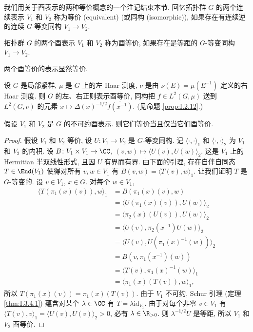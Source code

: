 我们用关于酉表示的两种等价概念的一个注记结束本节. 回忆拓扑群 $G$ 的两个连续表示 $V_1$ 和 $V_2$ 称为等价 (equivalent) (或同构 (isomorphic)), 如果存在有连续逆的连续 $G$-等变同构 $V_1 \to V_2$.

\begin{definition}
\label{def:IV.2.4}
拓扑群 $G$ 的两个酉表示 $V_1$ 和 $V_2$ 称为酉等价, 如果存在是等距的 $G$-等变同构 $V_1 \to V_2$.
\end{definition}

两个酉等价的表示显然等价.

\begin{example}[左右正则表示的酉等价]
\label{exa:IV.2.5}
设 $G$ 是局部紧群, $\mu$ 是 $G$ 上的左 Haar 测度, $\nu$ 是由 $\nu(E) = \mu(E^{-1})$ 定义的右 Haar 测度.
则 $G$ 的左、右正则表示酉等价, 同构把 $f \in L^2(G, \mu)$ 送到 $L^2(G, \nu)$ 的元素 $x \longmapsto \Delta(x)^{-1/2}\overline{f(x^{-1})}$. (见命题 \ref{prop:I.2.12}.)
\end{example}

\begin{proposition}[不可约表示的等价与酉等价]
\label{prop:IV.2.6}
假设 $V_1$ 和 $V_2$ 是 $G$ 的不可约酉表示. 则它们等价当且仅当它们酉等价.
\end{proposition}

\begin{proof}
假设 $V_1$ 和 $V_2$ 等价, 设 $U \colon V_1 \to V_2$ 是 $G$-等变同构. 记 $\langle \cdot, \cdot \rangle_1$ 和 $\langle \cdot, \cdot \rangle_2$ 为 $V_1$ 和 $V_2$ 的内积. 设 $B \colon V_1 \times V_1 \to \CC$, $(v, w) \longmapsto \langle U(v), U(w) \rangle_2$. 这是 $V_1$ 上的 Hermitian 半双线性形式, 且因 $U$ 有界而有界. 由下面的引理, 存在自伴自同态 $T \in \End(V_1)$ 使得对所有 $v, w \in V_1$ 有 $B(v, w) = \langle T(v), w \rangle_1$. 让我们证明 $T$ 是 $G$-等变的. 设 $v \in V_1$, $x \in G$. 对每个 $w \in V_1$,
\begin{align*}
\langle T(\pi_1(x)(v)), w \rangle_1 &= B(\pi_1(x)(v), w) \\
&= \langle U(\pi_1(x)(v)), U(w) \rangle_2 \\
&= \langle \pi_2(x)(U(v)), U(w) \rangle_2 \\
&= \langle U(v), \pi_2(x^{-1})U(w) \rangle_2 \\
&= \langle U(v), U(\pi_1(x)^{-1}(w)) \rangle_2 \\
&= B(v, \pi_1(x^{-1})(w)) \\
&= \langle T(v), \pi_1(x)^{-1}(w) \rangle_1 \\
&= \langle \pi_1(x)(T(v)), w \rangle_1,
\end{align*}
所以 $T(\pi_1(x)(v)) = \pi_1(x)(T(v))$. 由于 $V_1$ 不可约, Schur 引理 (定理 \ref{thm:I.3.4.1}) 蕴含对某个 $\lambda \in \CC$ 有 $T = \lambda\mathrm{id}_{V_1}$. 由于对每个非零 $v \in V_1$ 有 $\langle T(v), v \rangle_1 = \langle U(v), U(v) \rangle_2 > 0$, 必有 $\lambda \in \R_{>0}$. 则 $\lambda^{-1/2}U$ 是等距, 所以 $V_1$ 和 $V_2$ 酉等价.
\end{proof}

